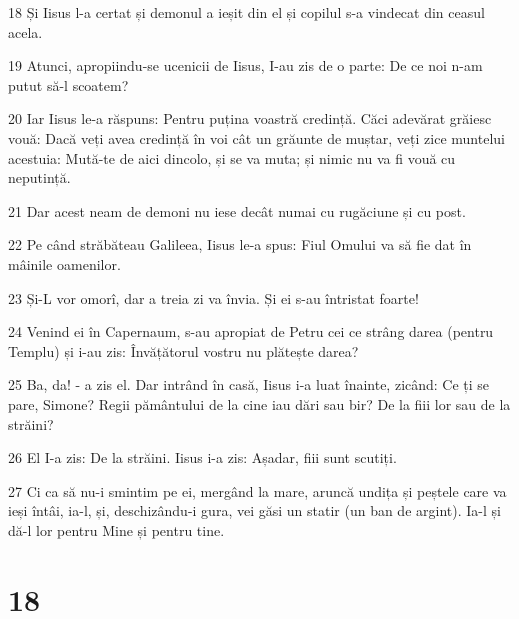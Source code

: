 \par 18 Și Iisus l-a certat și demonul a ieșit din el și copilul s-a vindecat din ceasul acela.
\par 19 Atunci, apropiindu-se ucenicii de Iisus, I-au zis de o parte: De ce noi n-am putut să-l scoatem?
\par 20 Iar Iisus le-a răspuns: Pentru puțina voastră credință. Căci adevărat grăiesc vouă: Dacă veți avea credință în voi cât un grăunte de muștar, veți zice muntelui acestuia: Mută-te de aici dincolo, și se va muta; și nimic nu va fi vouă cu neputință.
\par 21 Dar acest neam de demoni nu iese decât numai cu rugăciune și cu post.
\par 22 Pe când străbăteau Galileea, Iisus le-a spus: Fiul Omului va să fie dat în mâinile oamenilor.
\par 23 Și-L vor omorî, dar a treia zi va învia. Și ei s-au întristat foarte!
\par 24 Venind ei în Capernaum, s-au apropiat de Petru cei ce strâng darea (pentru Templu) și i-au zis: Învățătorul vostru nu plătește darea?
\par 25 Ba, da! - a zis el. Dar intrând în casă, Iisus i-a luat înainte, zicând: Ce ți se pare, Simone? Regii pământului de la cine iau dări sau bir? De la fiii lor sau de la străini?
\par 26 El I-a zis: De la străini. Iisus i-a zis: Așadar, fiii sunt scutiți.
\par 27 Ci ca să nu-i smintim pe ei, mergând la mare, aruncă undița și peștele care va ieși întâi, ia-l, și, deschizându-i gura, vei găsi un statir (un ban de argint). Ia-l și dă-l lor pentru Mine și pentru tine.

\chapter{18}

